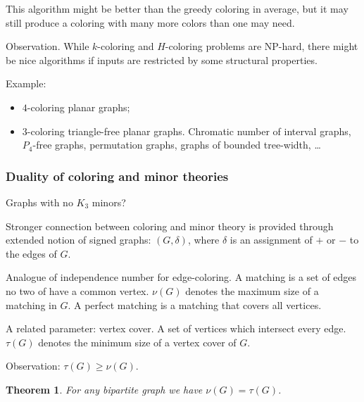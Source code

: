 \documentclass[12pt,a4paper]{article}
\newtheorem{theorem}{Theorem}
\begin{document}
This algorithm might be better than the greedy coloring in average, but it may
still produce a coloring with many more colors than one may need.

Observation.  While \(k\)-coloring and \(H\)-coloring problems are NP-hard,
there might be nice algorithms if inputs are restricted by some structural
properties.

Example:
\begin{itemize}
\item \(4\)-coloring planar graphs;
\item \(3\)-coloring triangle-free planar graphs.  Chromatic number of interval
  graphs, \(P_4\)-free graphs, permutation graphs, graphs of bounded tree-width,
  …
\end{itemize}

\subsubsection{Duality of coloring and minor theories}
Graphs with no \(K_3\) minors?

Stronger connection between coloring and minor theory is provided through
extended notion of signed graphs: \((G, \delta)\), where \(\delta\) is an
assignment of \(+\) or \(-\) to the edges of \(G\).

Analogue of independence number for edge-coloring.  A matching is a set of edges
no two of have a common vertex.  \(\nu(G)\) denotes the maximum size of a matching
in \(G\).  A perfect matching is a matching that covers all vertices.

A related parameter: vertex cover.  A set of vertices which intersect every
edge.  \(\tau(G)\) denotes the minimum size of a vertex cover of \(G\).

Observation: \(\tau(G) \geq \nu(G)\).

\begin{theorem}
  For any bipartite graph we have \(\nu(G) = \tau(G)\).
\end{theorem}
\end{document}
